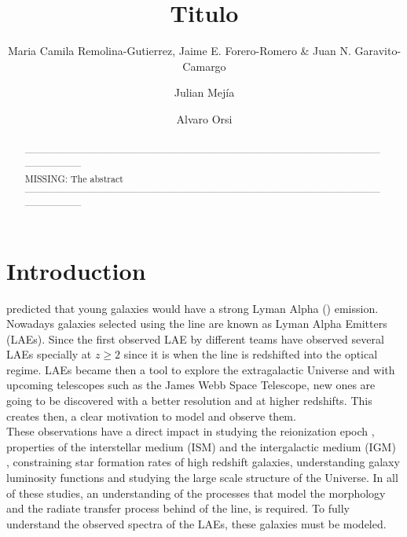 \documentclass{latex/emulateapj}
\begin{document}
\title{Titulo}


\author{Maria Camila Remolina-Gutierrez, Jaime E. Forero-Romero \&
  Juan N. Garavito-Camargo} 
\author{Julian Mej\'ia}
\author{Alvaro Orsi}


\begin{abstract}
\noindent ------------------------------------------------------------------------------------------------------------------------------------\\
MISSING: The abstract\\
------------------------------------------------------------------------------------------------------------------------------------\\
\end{abstract}

\section{Introduction}
\label{sec:intro}

\cite{PartridgePeebles} predicted that young galaxies would have a strong Lyman Alpha (\lya) emission. Nowadays galaxies selected using the \lya line are known as Lyman Alpha Emitters (LAEs). Since the first observed LAE by \cite{DjorgovskiThompson} different teams have observed several LAEs \cite{Rhoads00,Gawiser2007,Koehler2007,Ouchi08,Yamada2012,Schenker2012,Kulas12, Yamada2012, Chonis2013,Finkelstein2013,Ostlin14} specially at $z\geq2$ since it is when the  line is redshifted into the optical regime.  LAEs became then a tool to explore the extragalactic Universe and with upcoming telescopes such as the James Webb Space Telescope, new ones are going to be discovered with a better resolution and at higher redshifts. This creates then, a clear motivation to model and observe them. \\
  
These observations have a direct impact in studying the reionization epoch \cite{review}, properties of the interstellar medium (ISM) and the intergalactic medium (IGM) \citep{Behrens13} \citep{DijkstraKramer}, constraining star formation rates of high redshift galaxies, understanding galaxy luminosity functions \cite{Max} and studying the large scale structure of the Universe. In all of these
studies, an understanding of the processes that model the morphology and the radiate transfer process behind  of the \lya line, is required. To fully understand the observed spectra of the LAEs, these galaxies must be modeled. \\
\end{document}
